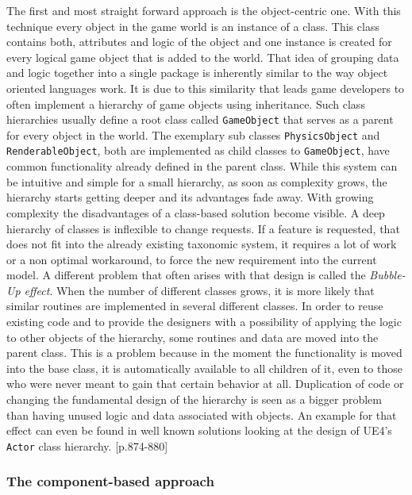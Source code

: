 The first and most straight forward approach is the object-centric one. With this technique every object in the game world is an instance of a class. This class contains both, attributes and logic of the object and one instance is created for every logical game object that is added to the world. That idea of grouping data and logic together into a single package is inherently similar to the way object oriented languages work. It is due to this similarity that leads game developers to often implement a hierarchy of game objects using inheritance. Such class hierarchies usually define a root class called \texttt{GameObject} that serves as a parent for every object in the world. The exemplary sub classes \texttt{PhysicsObject} and \texttt{RenderableObject}, both are implemented as child classes to \texttt{GameObject}, have common functionality already defined in the parent class. While this system can be intuitive and simple for a small hierarchy, as soon as complexity grows, the hierarchy starts getting deeper and its advantages fade away. With growing complexity the disadvantages of a class-based solution become visible. A deep hierarchy of classes is inflexible to change requests. If a feature is requested, that does not fit into the already existing taxonomic system, it requires a lot of work or a non optimal workaround, to force the new requirement into the current model. 
A different problem that often arises with that design is called the \textit{Bubble-Up effect}. When the number of different classes grows, it is more likely that similar routines are implemented in several different classes. In order to reuse existing code and to provide the designers with a possibility of applying the logic to other objects of the hierarchy, some routines and data are moved into the parent class. This is a problem because in the moment the functionality is moved into the base class, it is automatically available to all children of it, even to those who were never meant to gain that certain behavior at all. Duplication of code or changing the fundamental design of the hierarchy is seen as a bigger problem than having unused logic and data associated with objects. An example for that effect can even be found in well known solutions looking at the design of \ac{UE4}'s \texttt{Actor} class hierarchy. \cite{GEA_2}[p.874-880]

\subsubsection{The component-based approach} \label{ecs_theory}

